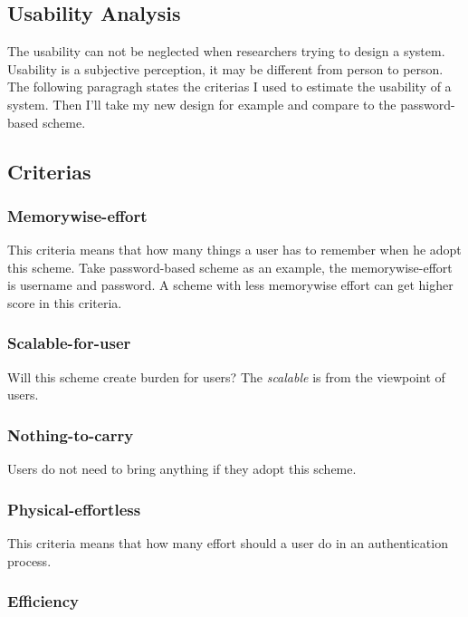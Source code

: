 \begin{CJK}{Bg5}{bsmi}
\section{Usability Analysis}

The usability can not be neglected when researchers trying to design a system.
Usability is a subjective perception, it may be different from person to person.
The following paragragh states the criterias I used to estimate the usability of a system. Then I'll take my new design for example and compare to the password-based scheme.

\subsection{Criterias}

\subsubsection{Memorywise-effort}

This criteria means that how many things a user has to remember when he adopt this scheme. Take password-based scheme as an example, the memorywise-effort is username and password. A scheme with less memorywise effort can get higher score in this criteria.

\subsubsection{Scalable-for-user}

Will this scheme create burden for users? The \emph{scalable} is from the viewpoint of users.

\subsubsection{Nothing-to-carry}

Users do not need to bring anything if they adopt this scheme.

\subsubsection{Physical-effortless}

This criteria means that how many effort should a user do in an authentication process.

\subsubsection{Efficiency}


\end{CJK}
